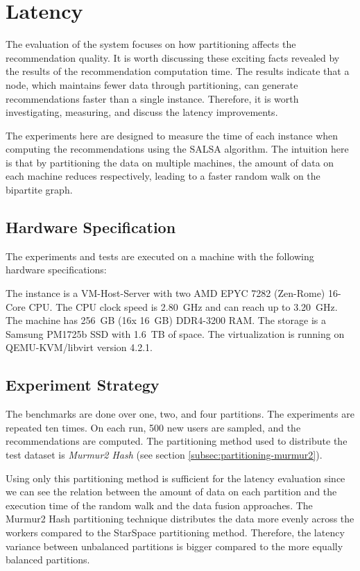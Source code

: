 \section{Latency}
\label{sec:eval-latency}
The evaluation of the system focuses on how partitioning affects the recommendation quality. It is worth discussing these exciting facts revealed by the results of the recommendation computation time. The results indicate that a node, which maintains fewer data through partitioning, can generate recommendations faster than a single instance. Therefore, it is worth investigating, measuring, and discuss the latency improvements.


The experiments here are designed to measure the time of each instance when computing the recommendations using the SALSA algorithm. The intuition here is that by partitioning the data on multiple machines, the amount of data on each machine reduces respectively, leading to a faster random walk on the bipartite graph. 

\subsection{Hardware Specification}
\label{subsec:hardware-spec}
The experiments and tests are executed on a machine with the following hardware specifications:

The instance is a VM-Host-Server with two AMD EPYC 7282 (Zen-Rome) 16-Core CPU. The CPU clock speed is 2.80~GHz and can reach up to 3.20~GHz. The machine has 256~GB (16x 16~GB) DDR4-3200 RAM. The storage is a Samsung PM1725b SSD with 1.6~TB of space. The virtualization is running on QEMU-KVM/libvirt version 4.2.1.


\subsection{Experiment Strategy}
\label{subsec:latency-experiment-strategy}
The benchmarks are done over one, two, and four partitions. The experiments are repeated ten times. On each run, 500 new users are sampled, and the recommendations are computed. The partitioning method used to distribute the test dataset is \emph{Murmur2 Hash} (see section \ref{subsec:partitioning-murmur2}). 


Using only this partitioning method is sufficient for the latency evaluation since we can see the relation between the amount of data on each partition and the execution time of the random walk and the data fusion approaches. The Murmur2 Hash partitioning technique distributes the data more evenly across the workers compared to the StarSpace partitioning method. Therefore, the latency variance between unbalanced partitions is bigger compared to the more equally balanced partitions.

